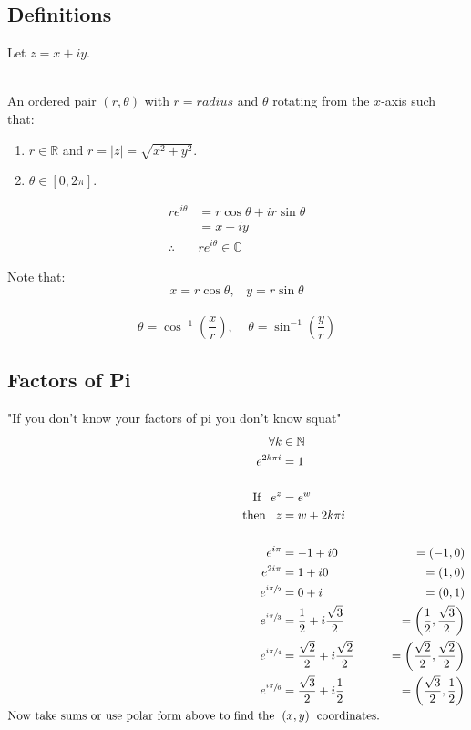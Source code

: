 \subsection{Definitions}
Let $z = x +iy.$ \\
\\
\begin{defn}
	An ordered pair $(r, \theta)$ with $r = radius$ and $\theta$ rotating from the $x$-axis such that:
	\begin{enumerate}
		\item $r \in \mathbb{R}$ and $r = |z| = \sqrt{x^2 + y^2}.$
		\item $\theta  \in [0, 2\pi].$
	\end{enumerate}
\end{defn}
\begin{defn}
	\begin{align*}
		re^{i\theta} &= r\cos{\theta} + ir\sin{\theta} \\
		&= x + iy \\
		\therefore \;\; &re^{i\theta} \in \mathbb{C}
	\end{align*}
\end{defn}
Note that:
\[x = r\cos{\theta}, \;\;\; y = r\sin{\theta}\]\\
\[\theta = \cos^{-1}{ \left( \frac{x}{r} \right)  }, \;\;\;\; \theta = \sin^{-1} \left( { \frac{y}{r} } \right) \]
\subsection{Factors of Pi}
\begin{defn}
	"If you don't know your factors of pi you don't know squat"
	\begin{align*}
		\forall k &\in \mathbb{N} \\
		e^{2k\pi i} &= 1 \\
		\\
		\text{If} \;\;\; e^z &= e^w \\ 
		\text{then} \;\;\; z &= w + 2k\pi i \\
		\\
		e^{i\pi} &= -1 + i0 
		&= (-1, 0) \\
		e^{2i\pi} &= 1 + i0 
		&= (1, 0) \\ 
		e^{\sfrac{i\pi}{2}} &= 0 +  i  
		&= (0, 1) \\
		e^{\sfrac{i\pi}{3}} &= \frac{1}{2} + i\frac{\sqrt{3}}{2} 
		&= \left(\frac{1}{2}, \frac{\sqrt{3}}{2} \right) \\
		e^{\sfrac{i\pi}{4}} &= \frac{\sqrt{2}}{2} + i\frac{\sqrt{2}}{2} 
		&= \left( \frac{\sqrt{2}}{2}, \frac{\sqrt{2}}{2} \right) \\
		e^{\sfrac{i\pi}{6}} &= \frac{\sqrt{3}}{2} + i\frac{1}{2} 
		&= \left( \frac{\sqrt{3}}{2}, \frac{1}{2} \right)  \\
		\text{Now take sums or use polar form above to find the \;} &(x, y) \text{\; coordinates.}
	\end{align*}
\end{defn}
 
